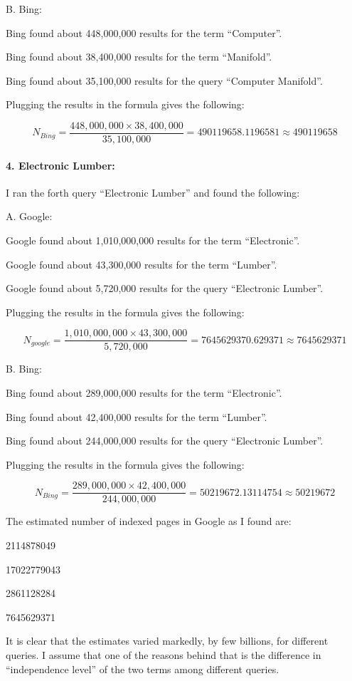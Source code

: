 \documentclass[a4paper, 11pt]{article}
\begin{document}
B. Bing:

Bing found about 448,000,000 results for the term ``Computer''.

Bing found about 38,400,000 results for the term ``Manifold''.

Bing found about 35,100,000 results for the query ``Computer Manifold''.

Plugging the results in the formula gives the following:

$$N_{Bing} = \frac{448,000,000 \times 38,400,000}{35,100,000} = 490119658.1196581 \approx 490119658
$$

\paragraph{4. Electronic Lumber:}
I ran the forth query ``Electronic Lumber'' and found the following:

A. Google:

Google found about 1,010,000,000 results for the term ``Electronic''.

Google found about 43,300,000 results for the term ``Lumber''.

Google found about 5,720,000 results for the query ``Electronic Lumber''.

Plugging the results in the formula gives the following:

$$N_{google} = \frac{1,010,000,000 \times 43,300,000}{5,720,000} = 7645629370.629371 \approx 7645629371
$$

B. Bing:

Bing found about 289,000,000 results for the term ``Electronic''.

Bing found about 42,400,000 results for the term ``Lumber''.

Bing found about 244,000,000 results for the query ``Electronic Lumber''.

Plugging the results in the formula gives the following:

$$N_{Bing} = \frac{289,000,000 \times 42,400,000}{244,000,000} = 50219672.13114754 \approx 50219672
$$

The estimated number of indexed pages in Google as I found are:

2114878049

17022779043

2861128284

7645629371

It is clear that the estimates varied markedly, by few billions, for different queries. I assume that one of the reasons behind that is the difference in ``independence level'' of the two terms among different queries.
\end{document}
